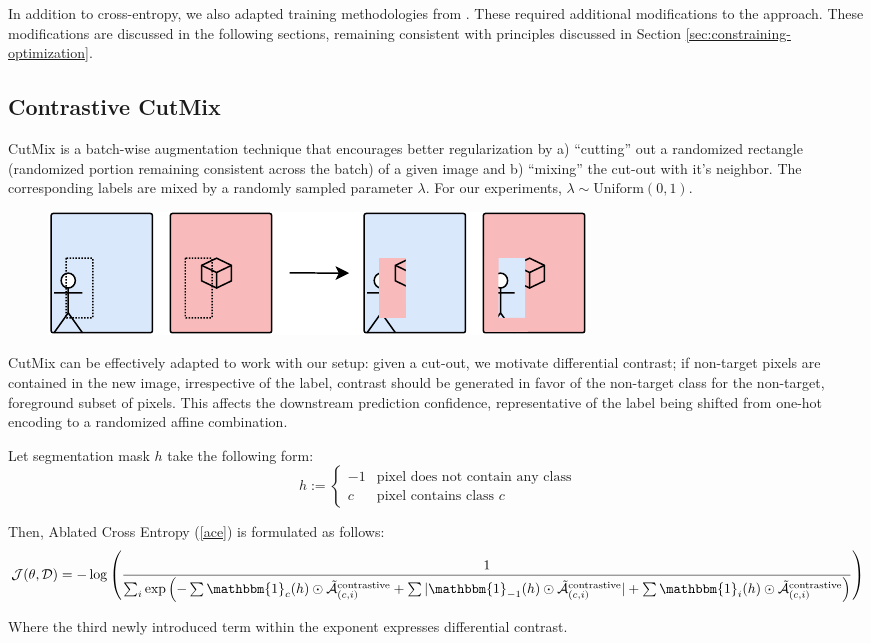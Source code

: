 \documentclass{article}
\theoremstyle{plain}
\theoremstyle{definition}
\theoremstyle{remark}
\newcommand{\contcam}[2]{\tilde{\mathcal{\bm{A}}}^{\text{contrastive}}_{(#1, #2)}}
\begin{document}
In addition to cross-entropy, we also adapted training methodologies from \citet{imagenetrecipe}. These required additional modifications to the approach. These modifications are discussed in the following sections, remaining consistent with principles discussed in Section \ref{sec:constraining-optimization}.

\subsection{Contrastive CutMix}

CutMix \citep{yun2019cutmix} is a batch-wise augmentation technique that encourages better regularization by a) ``cutting'' out a randomized rectangle (randomized portion remaining consistent across the batch) of a given image and b) ``mixing'' the cut-out with it's neighbor. The corresponding labels are mixed by a randomly sampled parameter $\lambda$. For our experiments, $\lambda \sim \text{Uniform}(0,1)$.

\begin{figure}[h!]
	\centering
	\includegraphics[width=\textwidth]{img/cutmix}
\end{figure}

CutMix can be effectively adapted to work with our setup: given a cut-out, we motivate differential contrast; if non-target pixels are contained in the new image, irrespective of the label, contrast should be generated in favor of the non-target class for the non-target, foreground subset of pixels. This affects the downstream prediction confidence, representative of the label being shifted from one-hot encoding to a randomized affine combination.

Let segmentation mask $h$ take the following form:
\begin{equation*}
	h := \begin{cases}
		-1 & \text{pixel does not contain any class} \\
		c & \text{pixel contains class } c
	\end{cases}
\end{equation*}

Then, Ablated Cross Entropy (\ref{ace}) is formulated as follows:
\begin{equation}
	\mathcal{J}(\theta, \mathcal{D}) = -\log \left( \frac{1}{\sum_i \text{exp}\left(-\sum \mathbbm{1}_{c}(h) \odot \contcam{c}{i} + \sum |\mathbbm{1}_{-1}(h) \odot \contcam{c}{i}| + \sum \mathbbm{1}_{i}(h) \odot \contcam{c}{i} \right)} \right)
\end{equation}

Where the third newly introduced term within the exponent expresses differential contrast.
\end{document}
